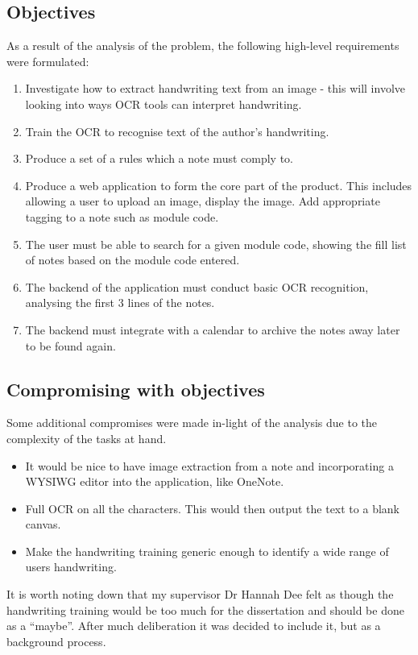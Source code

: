 \subsection{Objectives}
As a result of the analysis of the problem, the following high-level requirements were formulated:
\begin{enumerate}
	\item Investigate how to extract handwriting text from an image - this will involve looking into ways OCR tools can interpret handwriting.
	\item Train the OCR to recognise text of the author's handwriting.
	\item Produce a set of a rules which a note must comply to.
	\item Produce a web application to form the core part of the product. This includes allowing a user to upload an image, display the image. Add appropriate tagging to a note such as module code.
	\item The user must be able to search for a given module code, showing the fill list of notes based on the module code entered.
	\item The backend of the application must conduct basic OCR recognition, analysing the first 3 lines of the notes.
	\item The backend must integrate with a calendar to archive the notes away later to be found again.
\end{enumerate}

\subsection{Compromising with objectives}
Some additional compromises were made in-light of the analysis due to the complexity of the tasks at hand.
\begin{itemize}
	\item It would be nice to have image extraction from a note and incorporating a WYSIWG editor into the application, like OneNote.
	\item Full OCR on all the characters. This would then output the text to a blank canvas.
	\item Make the handwriting training generic enough to identify a wide range of users handwriting.
\end{itemize}

It is worth noting down that my supervisor Dr Hannah Dee felt as though the handwriting training would be too much for the dissertation and should be done as a ``maybe''. After much deliberation it was decided to include it, but as a background process.

